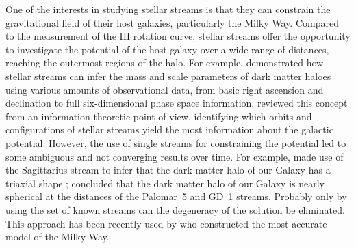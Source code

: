 \documentclass{aa}
\begin{document}
  One of the interests in studying stellar streams is that they can constrain the gravitational field of their host galaxies, particularly the Milky Way. Compared to the measurement of the HI rotation curve, stellar streams offer the opportunity to investigate the potential of the host galaxy over a wide range of distances, reaching the outermost regions of the halo. For example, \citet{2011MNRAS.417..198V} demonstrated how stellar streams can infer the mass and scale parameters of dark matter haloes using various amounts of observational data, from basic right ascension and declination to full six-dimensional phase space information. \citet{2018ApJ...867..101B} reviewed this concept from an information-theoretic point of view, identifying which orbits and configurations of stellar streams yield the most information about the galactic potential. However, the use of single streams for constraining the potential led to some ambiguous and not converging results over time. For example, \citet{2010ApJ...718.1128L} made use of the Sagittarius stream to infer that the dark matter halo of our Galaxy has a triaxial shape \citep[but see also][]{2004MNRAS.351..643H, 2005ApJ...619..800J, 2005ApJ...619..807L}; \citet{2016ApJ...833...31B} concluded that the dark matter halo of our Galaxy is nearly spherical at the distances of the Palomar~5 and GD~1 streams. Probably only by using the set of known streams can the degeneracy of the solution be eliminated. This approach has been recently used by \citet{2024ApJ...967...89I} who constructed the most accurate model of the Milky Way.


  
\end{document}
